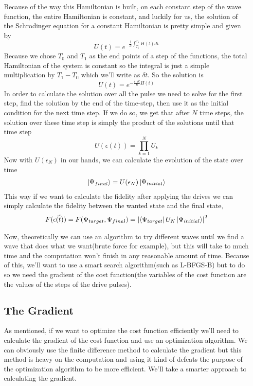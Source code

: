 \documentclass[english, a4paper, 12pt, twoside]{article}
\numberwithin{equation}{section} %
\begin{document}
Because of the way this Hamiltonian is built, on each constant step of the wave function, the entire Hamiltonian is constant, and luckily for us, the solution of the Schrodinger equation for a constant Hamiltonian is pretty simple and given by
\begin{equation}
U(t) = e^{-\frac{i}{\hbar}\int_{T_0}^{T_1}H(t)dt}
\end{equation}
Because we chose $T_0$ and $T_1$ as the end points of a step of the functions, the total Hamiltonian of the system is constant so the integral is just a simple multiplication by $T_1-T_0$ which we'll write as $\delta t$. So the solution is
\begin{equation}
U(t) = e^{-\frac{i\cdot \delta t}{\hbar}H(t)}
\end{equation}
In order to calculate the solution over all the pulse we need to solve for the first step, find the solution by the end of the time-step, then use it as the initial condition for the next time step. If we do so, we get that after $N$ time steps, the solution over these time step is simply the product of the solutions until that time step
\begin{equation}\label{eq:U_def_prod}
U(\epsilon(t)) = \prod_{k = 1}^NU_k
\end{equation}
Now with $U(\epsilon_N)$ in our hands, we can calculate the evolution of the state over time
\begin{equation}
\ket{\Psi_{final}} = U(\epsilon_N)\ket{\Psi_{initial}}
\end{equation}
This way if we want to calculate the fidelity after applying the drives we can simply calculate the fidelity between the wanted state and the final state,
\begin{equation} \label{eq:fidelity_sim}
F(\Vec{\epsilon(t)}) = F(\Psi_{target}, \Psi_{final}) = \abs{\bra{\Psi_{target}}U_N\ket{\Psi_{initial}}}^2
\end{equation}

Now, theoretically we can use an algorithm to try different waves until we find a wave that does what we want(brute force for example), but this will take to much time and the computation won't finish in any reasonable amount of time. Because of this, we'll want to use a smart search algorithm(such as L-BFGS-B) but to do so we need the gradient of the cost function(the variables of the cost function are the values of the steps of the drive pulses).

\subsection{The Gradient}
As mentioned, if we want to optimize the cost function efficiently we'll need to calculate the gradient of the cost function and use an optimization algorithm. We can obviously use the finite difference method to calculate the gradient but this method is heavy on the computation and using it kind of defeats the purpose of the optimization algorithm to be more efficient. We'll take a smarter approach to calculating the gradient.
\end{document}
